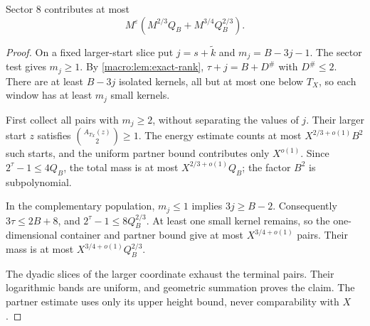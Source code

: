 \begin{proposition}\label{prop:terminal-final}
Sector 8 contributes at most
\[
 M^\varepsilon\left(M^{2/3}Q_B+M^{3/4}Q_B^{2/3}\right).
\]
\end{proposition}
\begin{proof}
On a fixed larger-start slice put $j=s+\widetilde k$ and
$m_j=B-3j-1$. The sector test gives $m_j\ge1$.
By \cref{macro:lem:exact-rank},
$\tau+j=B+D^\#$ with $D^\#\le2$.
There are at least $B-3j$ isolated kernels, all but at most one below
$T_X$, so each window has at least $m_j$ small kernels.

First collect all pairs with $m_j\ge2$, without separating the values
of $j$. Their larger start $z$ satisfies
$\binom{A_{T_X}(z)}2\ge1$. The energy estimate counts at most
$X^{2/3+o(1)}B^2$ such starts, and the uniform partner bound contributes
only $X^{o(1)}$. Since $2^\tau-1\le4Q_B$, the total mass is at most
$X^{2/3+o(1)}Q_B$; the factor $B^2$ is subpolynomial.

In the complementary population, $m_j\le1$ implies $3j\ge B-2$.
Consequently $3\tau\le2B+8$, and
$2^\tau-1\le8Q_B^{2/3}$. At least one small kernel remains, so the
one-dimensional container and partner bound give at most
$X^{3/4+o(1)}$ pairs. Their mass is at most
$X^{3/4+o(1)}Q_B^{2/3}$.

The dyadic slices of the larger coordinate exhaust the terminal pairs.
Their logarithmic bands are uniform, and geometric summation proves the
claim. The partner estimate uses only its upper height bound, never
comparability with $X$.
\end{proof}

